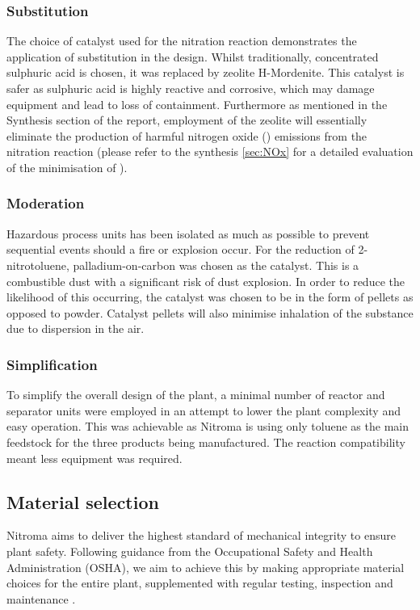 \subsubsection{Substitution} 
The choice of catalyst used for the nitration reaction demonstrates the application of substitution in the design. Whilst traditionally, concentrated sulphuric acid is chosen, it was replaced by zeolite H-Mordenite. This catalyst is safer as sulphuric acid is highly reactive and corrosive, which may damage equipment and lead to loss of containment. Furthermore as mentioned in the Synthesis section of the report, employment of the zeolite will essentially eliminate the production of harmful nitrogen oxide () emissions from the nitration reaction (please refer to the synthesis \cref{sec:NOx} for a detailed evaluation of the minimisation of ).  

\subsubsection{Moderation} 
Hazardous process units has been isolated as much as possible to prevent sequential events should a fire or explosion occur. For the reduction of 2-nitrotoluene,  palladium-on-carbon was chosen as the catalyst. This is a combustible dust with a significant risk of dust explosion. In order to reduce the likelihood of this occurring, the catalyst was chosen to be in the form of pellets as opposed to powder. Catalyst pellets will also minimise inhalation of the substance due to dispersion in the air. 

\subsubsection{Simplification} 
To simplify the overall design of the plant, a minimal number of reactor and separator units were employed in an attempt to lower the plant complexity and easy operation. This was achievable as Nitroma is using only toluene as the main feedstock for the three products being manufactured. The reaction compatibility meant less equipment was required. 

\subsection{Material selection}

Nitroma aims to deliver the highest standard of mechanical integrity to ensure plant safety.  Following guidance from the Occupational Safety and Health Administration (OSHA), we aim to achieve this by making appropriate material choices for the entire plant, supplemented with regular testing, inspection and maintenance \cite{life_cycle_engineering_what_nodate}. 

